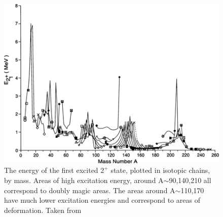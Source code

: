 \begin{figure}[!]
    \centering
    \includegraphics[scale=2]{Introduction_Figs/E2byMassCasten.png}
    \caption{The energy of the first excited $2^+$ state, plotted in isotopic chains, by mass. Areas of high excitation energy, around A$\sim$90,140,210 all correspond to doubly magic areas. The areas around A$\sim$110,170 have much lower excitation energies and correspond to areas of deformation.  Taken from \citep{casten90:_structure}}
    \label{fig:E2bymass}
\end{figure}